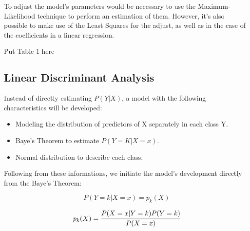 \documentclass[conference]{IEEEtran}
\newcommand{\reviewUrgent}[1]{{\color{red} #1}} %
\begin{document}
To adjust the model's parameters would be necessary to use
the Maximum-Likelihood technique to perform an estimation of them. However, it's also possible
to make use of the Least Squares for the adjust, as well as in the case of the 
coefficients in a linear regression.

\reviewUrgent{Put Table 1 here}


\subsection{Linear Discriminant Analysis}

Instead of directly estimating $P(Y|X)$, a model with the following characteristics will 
be developed:

\begin{itemize}
    \item Modeling the distribution of predictors of X separately in each class Y.
    \item Baye's Theorem to estimate $P(Y = K|X = x)$.
    \item Normal distribution to describe each class.
\end{itemize}

Following from these informations, we initiate the model's development directly from the 
Baye's Theorem:

\begin{equation}
    P(Y=k|X=x) = p_k(X) \label{eq4}
\end{equation}

\begin{equation}
    p_k(X) = \cfrac{P(X=x|Y=k)P(Y = k)}{P(X=x)} \label{eq5}
\end{equation}
\end{document}
